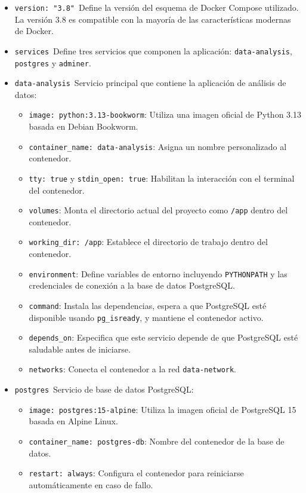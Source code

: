 \begin{itemize}
  \item \texttt{version: "3.8"}\
  Define la versión del esquema de Docker Compose utilizado. La versión 3.8 es compatible con la mayoría de las características modernas de Docker.
  \item \texttt{services}\
  Define tres servicios que componen la aplicación: \texttt{data-analysis}, \texttt{postgres} y \texttt{adminer}.
  \item \texttt{data-analysis}\
  Servicio principal que contiene la aplicación de análisis de datos:
  \begin{itemize}
  \item \texttt{image: python:3.13-bookworm}: Utiliza una imagen oficial de Python 3.13 basada en Debian Bookworm.
  \item \texttt{container\_name: data-analysis}: Asigna un nombre personalizado al contenedor.
  \item \texttt{tty: true} y \texttt{stdin\_open: true}: Habilitan la interacción con el terminal del contenedor.
  \item \texttt{volumes}: Monta el directorio actual del proyecto como \texttt{/app} dentro del contenedor.
  \item \texttt{working\_dir: /app}: Establece el directorio de trabajo dentro del contenedor.
  \item \texttt{environment}: Define variables de entorno incluyendo \texttt{PYTHONPATH} y las credenciales de conexión a la base de datos PostgreSQL.
  \item \texttt{command}: Instala las dependencias, espera a que PostgreSQL esté disponible usando \texttt{pg\_isready}, y mantiene el contenedor activo.
  \item \texttt{depends\_on}: Especifica que este servicio depende de que PostgreSQL esté saludable antes de iniciarse.
  \item \texttt{networks}: Conecta el contenedor a la red \texttt{data-network}.
  \end{itemize}
  \item \texttt{postgres}\
  Servicio de base de datos PostgreSQL:
  \begin{itemize}
  \item \texttt{image: postgres:15-alpine}: Utiliza la imagen oficial de PostgreSQL 15 basada en Alpine Linux.
  \item \texttt{container\_name: postgres-db}: Nombre del contenedor de la base de datos.
  \item \texttt{restart: always}: Configura el contenedor para reiniciarse automáticamente en caso de fallo.

\end{itemize}
\end{itemize}
